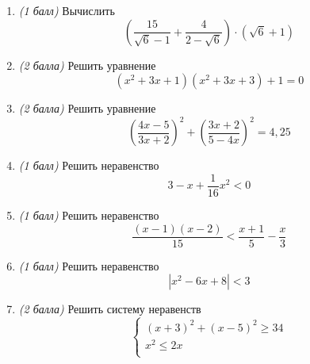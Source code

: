 \documentclass[12pt, a4paper]{article}
\begin{document}
	
	\begin{enumerate}
		\item \textit{(1 балл)} Вычислить $$\left(\dfrac{15}{\sqrt{6}-1}+\dfrac{4}{2-\sqrt{6}}\right)\cdot(\sqrt{6}+1)$$
		\item \textit{(2 балла)} Решить уравнение $$(x^2+3x+1)(x^2+3x+3)+1=0$$
		\item \textit{(2 балла)} Решить уравнение $$\left(\dfrac{4x-5}{3x+2}\right)^2+\left(\dfrac{3x+2}{5-4x}\right)^2=4,25$$
		\item \textit{(1 балл)} Решить неравенство $$3-x+\dfrac{1}{16}x^2<0$$
		\item \textit{(1 балл)} Решить неравенство $$\dfrac{(x-1)(x-2)}{15}<\dfrac{x+1}{5}-\dfrac{x}{3}$$
		\item \textit{(1 балл)} Решить неравенство $$|x^2-6x+8|<3$$
		\item \textit{(2 балла)} Решить систему неравенств 
		$$
		\left\{
		\begin{array}{l}
			(x+3)^2 + (x-5)^2 \geq 34   \\
			x^2 \leq 2x  \\
		\end{array}
		\right.
		$$
	\end{enumerate}
\end{document}
